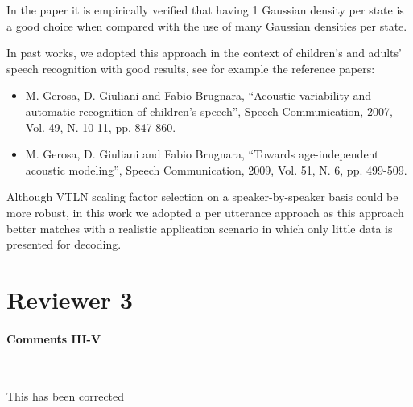 \documentclass[]{article}
\begin{document}
In the paper it is empirically verified that having 1 Gaussian density
per state is a good  choice when compared
with the use of many Gaussian densities per state.

In past works, we  adopted this approach  in the context  of children's
and adults' speech recognition  with good results,  see for example  the reference
papers:

\begin{itemize}
\item M. Gerosa, D. Giuliani  and Fabio Brugnara, ``Acoustic variability and
automatic recognition of children’s speech'', Speech Communication,
2007, Vol. 49, N. 10-11, pp. 847-860.
\item M. Gerosa, D. Giuliani and Fabio Brugnara, ``Towards age-independent acoustic modeling'',
Speech Communication, 2009, Vol. 51, N. 6, pp. 499-509.
\end{itemize}

Although VTLN scaling factor selection on a speaker-by-speaker basis
could be more robust, in this work we adopted a per utterance approach
as this approach better matches with a realistic application scenario
in which only little data is presented for decoding.



\section{Reviewer 3}

\paragraph{Comments III-V}

~

This has been corrected

\end{document}
